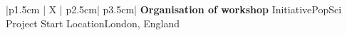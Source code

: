 %
\iftrue %
\begin{myTableEnv}{|p{1.5cm} | X | p{2.5cm}| p{3.5cm}|}
    \myRow
        {}
        {\bfseries Organisation of workshop}
        {Initiative}{PopSci Project}
    \myRow
        {Start}{}
        {Location}{London, England}
\end{myTableEnv}
%
\fi%
%
